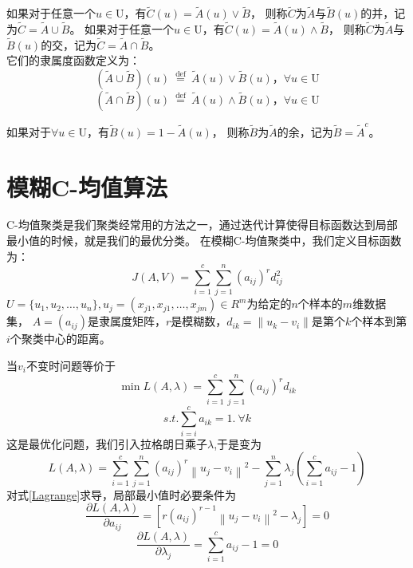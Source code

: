 \begin{definition}
    如果对于任意一个$u \in \mathrm{U}$，有$\tilde{C}(u)=\tilde{A}(u) \vee \tilde{B}$，
    则称$\tilde{C}$为$\tilde{A}$与$\tilde{B}(u)$的并，记为$\tilde{C}=\tilde{A} \cup \tilde{B}$。
    如果对于任意一个$u \in \mathrm{U}$，有$\tilde{C}(u)=\tilde{A}(u) \wedge \tilde{B}$，
    则称$\tilde{C}$为$\tilde{A}$与$\tilde{B}(u)$的交，记为$\tilde{C}=\tilde{A} \cap \tilde{B}$。\\
    它们的隶属度函数定义为：
    \[
        (\tilde{A}\cup  \tilde{B})(u) \stackrel{\text { def }}{=}\tilde{A}(u) \vee \tilde{B}(u) ， \forall u \in \mathrm{U}
    \]
    \[
        (\tilde{A}\cap   \tilde{B})(u) \stackrel{\text { def }}{=}\tilde{A}(u) \wedge \tilde{B}(u) ，\forall u \in \mathrm{U}
    \]
\end{definition}
\begin{definition}
    如果对于$\forall u \in \mathrm{U}$，有$\tilde{B}(u)=1-\tilde{A}(u) $，
    则称$\tilde{B}$为$\tilde{A}$的余，记为$\tilde{B}=\tilde{A}^c$。
\end{definition}
\section{模糊C-均值算法}
C-均值聚类是我们聚类经常用的方法之一，通过迭代计算使得目标函数达到局部最小值的时候，就是我们的最优分类。
在模糊C-均值聚类中，我们定义目标函数为：
\begin{equation}
    J(A, V)=\sum_{i=1}^{c} \sum_{j=1}^{n}\left(a_{i j}\right)^{r} d_{i j}^2
\end{equation}
$U=\{u_1,u_2,\dots,u_n\},u_j=(x_{j1},x_{j1},\dots,x_{jm})\in R^m$为给定的$n$个样本的$m$维数据集，
$A=(a_{i j})$是隶属度矩阵，$r$是模糊数，$d_{i k}=\| u_k-v_i\|$是第个$k$个样本到第$i$个聚类中心的距离。
\par
当$v_i$不变时问题等价于
\begin{equation}
    \min L(A, \lambda)=\sum_{i=1}^{c} \sum_{j=1}^{n}\left(a_{i j}\right)^{r}d_{i k}
\end{equation}
\begin{equation}
    s.t.  \sum_{i=i}^c a_{i k}=1.\  \forall k
\end{equation}
这是最优化问题，我们引入拉格朗日乘子$\lambda$,于是变为
\begin{equation}
    L(A, \lambda)=\sum_{i=1}^{c} \sum_{j=1}^{n}\left(a_{i j}\right)^{r}\left\|u_{j}-v_{i}\right\|^{2}-\sum_{j=1}^{n} \lambda_{j}\left(\sum_{i=1}^{c} a_{i j}-1\right)
    \label{Lagrange}
\end{equation}
对式\ref{Lagrange}求导，局部最小值时必要条件为
\begin{equation}
    \frac{\partial L(A, \lambda)}{\partial a_{i j}}=\left[r\left(a_{i j}\right)^{r-1}\left\|u_{j}-v_{i}\right\|^{2}-\lambda_{j}\right]=0
    \label{dLdAij}
\end{equation}
\begin{equation}
    \frac{\partial L(A, \lambda)}{\partial \lambda_{j}}=\sum_{i=1}^{c} a_{i j}-1=0
    \label{dLdLamda}
\end{equation}

